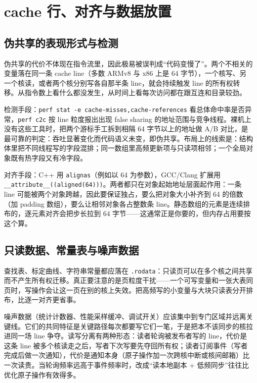 \documentclass[12pt,a4paper,fontset=fandol]{ctexbook}
\newcommand{\Tp}[1]{\texttt{#1}}
\newcommand{\Bk}{\discretionary{}{}{}}
\newcommand{\Lang}[1]{\textsf{#1}}
\newcommand{\CPP}{\Lang{C++}}
\begin{document}
\section{cache 行、对齐与数据放置}

\subsection*{伪共享的表现形式与检测}

伪共享的代价不体现在指令流里，因此极易被误判成“代码变慢了”。两个不相关的变量落在同一条 cache line（多数 ARMv8 与 x86 上是 64 字节），一个核写、另一个核读，或者两个核分别写各自那半条 line，就会持续触发 line 的所有权转移。从指令数上看什么都没发生，从时间上看每次访问都在跟互连和目录较劲。

检测手段：\texttt{perf stat -e cache-misses,cache-references} 看总体命中率是否异常，\texttt{perf c2c} 按 line 粒度报出出现 false sharing 的地址范围与竞争线程。裸机上没有这些工具时，把两个游标手工拆到相隔 64 字节以上的地址做 A/B 对比，是最可靠的判定：吞吐显著变化而代码语义未变，即伪共享。布局上的线索是：结构体里把不同线程写的字段混排；同一数组里高频更新项与只读项相邻；一个全局对象既有热字段又有冷字段。

对齐手段：\CPP{} 用 \Tp{alignas}（例如以 64 为参数），GCC/Clang 扩展用 \texttt{\_{\Bk}\_{\Bk}attribute\_{\Bk}\_{\Bk}((aligned(64)))}。两者都只在对象起始地址层面起作用：一条 line 可能被两个对象跨越，因此要保证独占，要么把对象大小补齐到 64 的倍数（加 padding 数组），要么让相邻对象各占整数条 line。静态数组的元素是连续排布的，逐元素对齐会把步长拉到 64 字节——这通常正是你要的，但内存占用要按这个算。

\subsection*{只读数据、常量表与噪声数据}

查找表、标定曲线、字符串常量都应落在 \texttt{.rodata}：只读页可以在多个核之间共享而不产生所有权迁移。真正要注意的是页粒度干扰——一个可写变量和一张大表同页时，写操作会让这一页在别的核上失效。把高频写的小变量与大块只读表分开排布，比逐一对齐更省事。

噪声数据（统计计数器、性能采样缓冲、调试开关）应该集中到专门区域并远离关键线。它们的共同特征是关键路径每次都要写它们一笔，于是把本不该同步的核拉进同一场 line 争夺。读写分离有两种形态：读者轮询被发布者写的 line，代价是这条 line 被多个核读走之后，写者下次写要先夺回所有权；读者订阅事件（写者完成后做一次通知），代价是通知本身（原子操作加一次跨核中断或核间邮箱）比一次读贵。当轮询频率远高于事件频率时，改成“读本地副本 + 低频同步”往往比优化原子操作有效得多。
\end{document}
